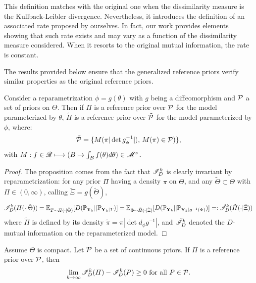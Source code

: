 This definition matches with the original one when the dissimilarity measure is the Kullback-Leibler divergence. Nevertheless, it introduces the definition of an associated rate proposed by ourselves. In fact, our
work provides elements showing that such rate exists and may vary as a function of the dissimilarity measure
considered. When it resorts to the original mutual information, the rate is constant.

The results provided below ensure that the generalized reference priors verify similar properties as the original reference priors.







\begin{prop}
    Consider a reparametrization $\phi=g(\theta)$ with $g$ being a diffeomorphism and $\mathcal{P}$ a set of priors on $\Theta$.
    Then if $\varPi$ is  a reference prior over $\mathcal{P}$ for the model parameterized by $\theta$, $\tilde{\varPi}$ is a reference prior over $\tilde{\mathcal{P}}$ for the model parameterized by $\phi$, where: 
    \begin{equation}
        \tilde{\mathcal{P}} = \{ M(\pi |\det g_\phi^{-1}|),\,M(\pi)\in\mathcal{P} ) \},
    \end{equation}
    with $M:f\in\mathscr{R}\longmapsto (B\mapsto\int_B f(\theta)d\theta)\in\mathscr{M}^\nu$. %
\end{prop}

\begin{proof}
    The proposition comes from the fact that $\mathscr{I}^k_D$ is
    clearly invariant by reparametrization: for any prior $\varPi$ having a density $\pi$ on $\Theta$, and any $\tilde\Theta\subset\Theta$ with $\varPi\in(0,\infty)$, calling $\tilde\Xi = g(\tilde\Theta) $,
        \begin{equation}
            \mathscr{I}^k_D(\varPi(\cdot|\tilde\Theta)) = \mathbb{E}_{T\sim\varPi(\cdot|\tilde\Theta)}[D(\mathbb{P}_{\mathbf{Y}_k}||\mathbb{P}_{\mathbf{Y}_k|T} )] = \mathbb{E}_{\Phi\sim\tilde\varPi(\cdot|\tilde\Xi)} [D(\mathbb{P}_{\mathbf{Y}_k}||\mathbb{P}_{\mathbf{Y}_k|g^{-1}(\Phi)} )] =: \tilde{\mathscr{I}}^k_D(\tilde\varPi(\cdot|\tilde\Xi))
        \end{equation}
    where $\tilde\varPi$ is defined by its density $\tilde\pi = \pi|\det d_\phi g^{-1}|$, and $\tilde{\mathscr{I}}^k_D$ denoted the $D$-mutual information on the reparameterized model.
\end{proof}

\begin{prop}
    Assume $\Theta$ is compact. Let $\mathcal{P}$ be a set of continuous priors. If $\varPi$ is a reference prior over $\mathcal{P}$, then
        \begin{equation}
            \lim_{k\rightarrow\infty} \mathscr{I}_D^k(\varPi) -\mathscr{I}_D^k(P) \geq0 \text{\ for all\ } P\in\mathcal{P}.
        \end{equation}
\end{prop}

